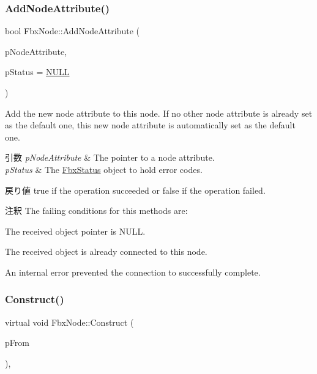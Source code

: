 \subsubsection{\texorpdfstring{Add\+Node\+Attribute()}{AddNodeAttribute()}}
{\footnotesize\ttfamily bool Fbx\+Node\+::\+Add\+Node\+Attribute (\begin{DoxyParamCaption}\item[{\hyperlink{class_fbx_node_attribute}{Fbx\+Node\+Attribute} $\ast$}]{p\+Node\+Attribute,  }\item[{\hyperlink{class_fbx_status}{Fbx\+Status} $\ast$}]{p\+Status = {\ttfamily \hyperlink{fbxarch_8h_a070d2ce7b6bb7e5c05602aa8c308d0c4}{N\+U\+LL}} }\end{DoxyParamCaption})}

Add the new node attribute to this node. If no other node attribute is already set as the default one, this new node attribute is automatically set as the default one. 
\begin{DoxyParams}{引数}
{\em p\+Node\+Attribute} & The pointer to a node attribute. \\
\hline
{\em p\+Status} & The \hyperlink{class_fbx_status}{Fbx\+Status} object to hold error codes. \\
\hline
\end{DoxyParams}
\begin{DoxyReturn}{戻り値}
{\ttfamily true} if the operation succeeded or {\ttfamily false} if the operation failed. 
\end{DoxyReturn}
\begin{DoxyRemark}{注釈}
The failing conditions for this methods are\+:
\begin{DoxyItemize}
\item The received object pointer is {\ttfamily N\+U\+LL}.
\item The received object is already connected to this node.
\item An internal error prevented the connection to successfully complete. 
\end{DoxyItemize}
\end{DoxyRemark}
\mbox{\label{class_fbx_node_af500d4f4573e566c878232d89d1b6a9e}} 
\subsubsection{\texorpdfstring{Construct()}{Construct()}}
{\footnotesize\ttfamily virtual void Fbx\+Node\+::\+Construct (\begin{DoxyParamCaption}\item[{const \hyperlink{class_fbx_object}{Fbx\+Object} $\ast$}]{p\+From }\end{DoxyParamCaption})\hspace{0.3cm}{\ttfamily [protected]}, {\ttfamily [virtual]}}

